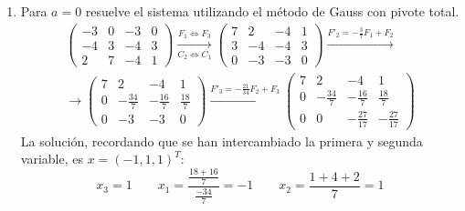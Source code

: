 \begin{ejercicio}
\begin{enumerate}
    \item Para $a=0$ resuelve el sistema utilizando el método de Gauss con pivote total.
    \begin{multline*}
        \left(\begin{array}{ccc|c}
            -3 & 0 & -3 & 0\\
             -4 & 3 & -4  & 3\\
             2 & 7 & -4 & 1
        \end{array}
        \right) \xrightarrow[C_2 \Longleftrightarrow C_1]{F_1 \Longleftrightarrow F_3}
        \left(\begin{array}{ccc|c}
              7 & 2 & -4 & 1 \\
              3 & -4 & -4  & 3\\
              0 & -3 & -3 & 0
        \end{array}
        \right)
        \xrightarrow{F'_2=-\frac{3}{7}F_1 + F_2} \\
        \longrightarrow \left(\begin{array}{ccc|c}
              7 & 2 & -4 & 1 \\
              0 & -\frac{34}{7} & -\frac{16}{7}  & \frac{18}{7}\\
              0 & -3 & -3 & 0
        \end{array}
        \right)
        \xrightarrow{F'_3 = -\frac{21}{34}F_2 + F_3}
        \left(\begin{array}{ccc|c}
            7 & 2 & -4  & 1\\
            0 & -\frac{34}{7} & -\frac{16}{7} & \frac{18}{7} \\
             0 & 0 & -\frac{27}{17} & -\frac{27}{17}
        \end{array}
        \right)
    \end{multline*}
    La solución, recordando que se han intercambiado la primera y segunda variable, es $x=(-1, 1, 1)^T$:
    \begin{equation*}
        x_3 = 1 \qquad x_1 = \frac{\frac{18+16}{7}}{\frac{-34}{7}} = -1 \qquad x_2 = \frac{1+4+2}{7} = 1
    \end{equation*}
    
    \end{enumerate}
\end{ejercicio}

